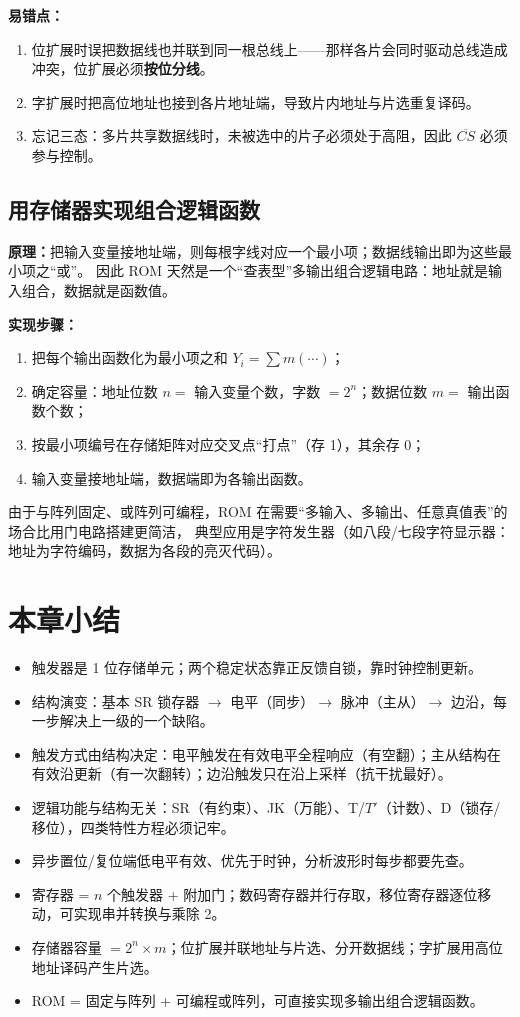 \noindent\textbf{易错点：}
\begin{enumerate}
    \item 位扩展时误把数据线也并联到同一根总线上——那样各片会同时驱动总线造成冲突，位扩展必须\textbf{按位分线}。
    \item 字扩展时把高位地址也接到各片地址端，导致片内地址与片选重复译码。
    \item 忘记三态：多片共享数据线时，未被选中的片子必须处于高阻，因此 $\overline{CS}$ 必须参与控制。
\end{enumerate}

\subsection{用存储器实现组合逻辑函数}
\textbf{原理：}把输入变量接地址端，则每根字线对应一个最小项；数据线输出即为这些最小项之“或”。
因此 ROM 天然是一个“查表型”多输出组合逻辑电路：地址就是输入组合，数据就是函数值。

\textbf{实现步骤：}
\begin{enumerate}
    \item 把每个输出函数化为最小项之和 $Y_i=\sum m(\cdots)$；
    \item 确定容量：地址位数 $n=$ 输入变量个数，字数 $=2^n$；数据位数 $m=$ 输出函数个数；
    \item 按最小项编号在存储矩阵对应交叉点“打点”（存 1），其余存 0；
    \item 输入变量接地址端，数据端即为各输出函数。
\end{enumerate}

\noindent 由于与阵列固定、或阵列可编程，ROM 在需要“多输入、多输出、任意真值表”的场合比用门电路搭建更简洁，
典型应用是字符发生器（如八段/七段字符显示器：地址为字符编码，数据为各段的亮灭代码）。

\section{本章小结}
\begin{itemize}
    \item 触发器是 1 位存储单元；两个稳定状态靠正反馈自锁，靠时钟控制更新。
    \item 结构演变：基本 SR 锁存器 $\rightarrow$ 电平（同步）$\rightarrow$ 脉冲（主从）$\rightarrow$ 边沿，每一步解决上一级的一个缺陷。
    \item 触发方式由结构决定：电平触发在有效电平全程响应（有空翻）；主从结构在有效沿更新（有一次翻转）；边沿触发只在沿上采样（抗干扰最好）。
    \item 逻辑功能与结构无关：SR（有约束）、JK（万能）、T/$T'$（计数）、D（锁存/移位），四类特性方程必须记牢。
    \item 异步置位/复位端低电平有效、优先于时钟，分析波形时每步都要先查。
    \item 寄存器 = $n$ 个触发器 + 附加门；数码寄存器并行存取，移位寄存器逐位移动，可实现串并转换与乘除 2。
    \item 存储器容量 $=2^n\times m$；位扩展并联地址与片选、分开数据线；字扩展用高位地址译码产生片选。
    \item ROM = 固定与阵列 + 可编程或阵列，可直接实现多输出组合逻辑函数。
\end{itemize}
